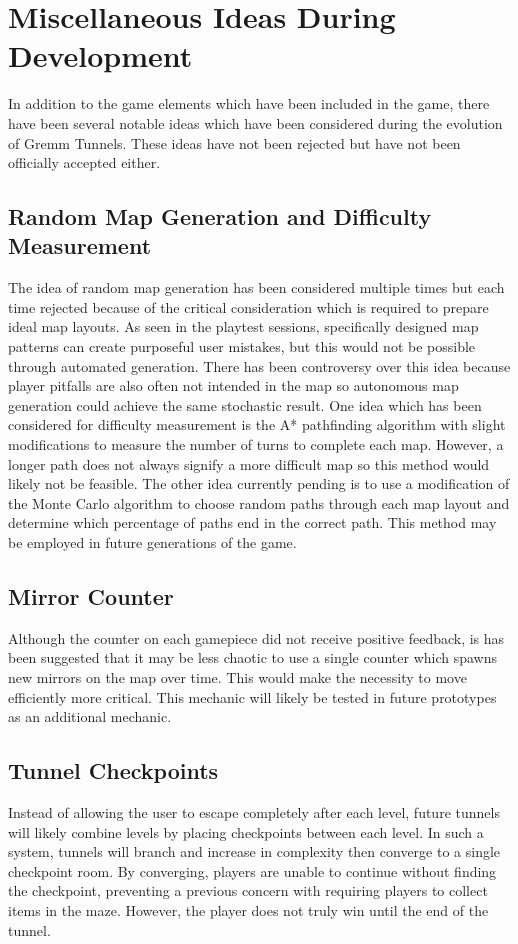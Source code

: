 \documentclass{scrreprt}
\begin{document}
		\section{Miscellaneous Ideas During Development}
			In addition to the game elements which have been included in the game, there have been several notable ideas which have been considered during the evolution of Gremm Tunnels. These ideas have not been rejected but have not been officially accepted either.
			
			\subsection{Random Map Generation and Difficulty Measurement}
				The idea of random map generation has been considered multiple times but each time rejected because of the critical consideration which is required to prepare ideal map layouts. As seen in the playtest sessions, specifically designed map patterns can create purposeful user mistakes, but this would not be possible through automated generation. There has been controversy over this idea because player pitfalls are also often not intended in the map so autonomous map generation could achieve the same stochastic result. One idea which has been considered for difficulty measurement is the A* pathfinding algorithm with slight modifications to measure the number of turns to complete each map. However, a longer path does not always signify a more difficult map so this method would likely not be feasible. The other idea currently pending is to use a modification of the Monte Carlo algorithm to choose random paths through each map layout and determine which percentage of paths end in the correct path. This method may be employed in future generations of the game. 
			
			\subsection{Mirror Counter}
				Although the counter on each gamepiece did not receive positive feedback, is has been suggested that it may be less chaotic to use a single counter which spawns new mirrors on the map over time. This would make the necessity to move efficiently more critical. This mechanic will likely be tested in future prototypes as an additional mechanic.
			
			\subsection{Tunnel Checkpoints}
				Instead of allowing the user to escape completely after each level, future tunnels will likely combine levels by placing checkpoints between each level. In such a system, tunnels will branch and increase in complexity then converge to a single checkpoint room. By converging, players are unable to continue without finding the checkpoint, preventing a previous concern with requiring players to collect items in the maze. However, the player does not truly win until the end of the tunnel. 
	
\end{document}
